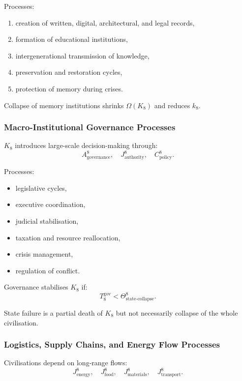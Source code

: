Processes:
\begin{enumerate}
    \item creation of written, digital, architectural, and legal records,
    \item formation of educational institutions,
    \item intergenerational transmission of knowledge,
    \item preservation and restoration cycles,
    \item protection of memory during crises.
\end{enumerate}

Collapse of memory institutions shrinks $\Omega(K_8)$ and reduces $k_8$.

\subsubsection{Macro-Institutional Governance Processes}

$K_8$ introduces large-scale decision-making through:
\[
A^8_{\text{governance}},\quad J^8_{\text{authority}},\quad
C^8_{\text{policy}}.
\]

Processes:
\begin{itemize}
    \item legislative cycles,
    \item executive coordination,
    \item judicial stabilisation,
    \item taxation and resource reallocation,
    \item crisis management,
    \item regulation of conflict.
\end{itemize}

Governance stabilises $K_8$ if:
\[
T_8^{\text{gov}} < \Theta^8_{\text{state-collapse}}.
\]

State failure is a partial death of $K_8$ but not necessarily collapse
of the whole civilisation.

\subsubsection{Logistics, Supply Chains, and Energy Flow Processes}

Civilisations depend on long-range flows:
\[
J^8_{\text{energy}},\quad
J^8_{\text{food}},\quad
J^8_{\text{materials}},\quad
J^8_{\text{transport}}.
\]

